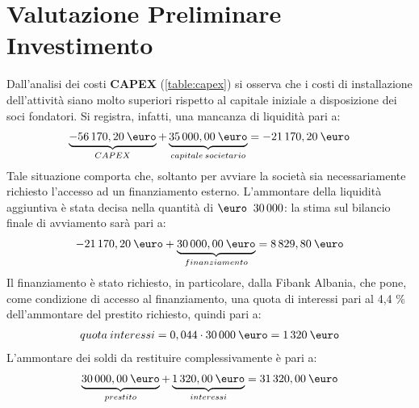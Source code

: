 \chapter[Valutazione Preliminare Investimento]{Valutazione Preliminare Investimento}
Dall'analisi dei costi \textbf{CAPEX} (\ref{table:capex}) si osserva che i costi di installazione dell'attività siano molto superiori rispetto al capitale iniziale a disposizione dei soci fondatori. \newline
Si registra, infatti, una mancanza di liquidità pari a:
	\begin{equation}
	\label{eq:bilancio_installazione}
	\begin{split}
 		\underbrace{-56\thinspace 170,20 \: \mbox{\euro}}_{CAPEX} + \underbrace{35\thinspace 000,00 \: \mbox{\euro}}_{capitale \: societario} = -21\thinspace 170,20 \: \mbox{\euro}
 	\end{split}
	\end{equation}
Tale situazione comporta che, soltanto per avviare la società sia necessariamente richiesto l'accesso ad un finanziamento esterno. \newline L'ammontare della liquidità aggiuntiva è stata decisa nella quantità di $\mbox{\euro \:30\thinspace 000}$: la stima sul bilancio finale di avviamento sarà pari a:
	\begin{equation}
	\label{eq:bilancio_finale_installazione}
	\begin{split}
		-21\thinspace 170,20 \: \mbox{\euro} + \underbrace{30\thinspace 000,00 \: \mbox{\euro}}_{finanziamento} = 8\thinspace 829,80 \: \mbox{\euro}
 	\end{split}
	\end{equation}
Il finanziamento è stato richiesto, in particolare, dalla \ac{Fibank Albania}, che pone, come condizione di accesso al finanziamento, una quota di interessi pari al 4,4 \% dell'ammontare del prestito richiesto, quindi pari a:
	\begin{equation}
	\label{eq:interessi_fibank}
	\begin{split}
		quota \: interessi = 0,044 \cdot 30\thinspace 000 \: \mbox{\euro} = 1\thinspace 320 \:\mbox{\euro} 
	\end{split}
	\end{equation}
L'ammontare dei soldi da restituire complessivamente è pari a:
	\begin{equation}
	\label{eq:somma_restituita}
	\begin{split}
		\underbrace{30\thinspace 000,00 \: \mbox{\euro}}_{prestito} + 
		\underbrace{1\thinspace 320,00 \: \mbox{\euro}}_{interessi} = 
		31\thinspace 320,00 \: \mbox{\euro}
	\end{split}
	\end{equation}
